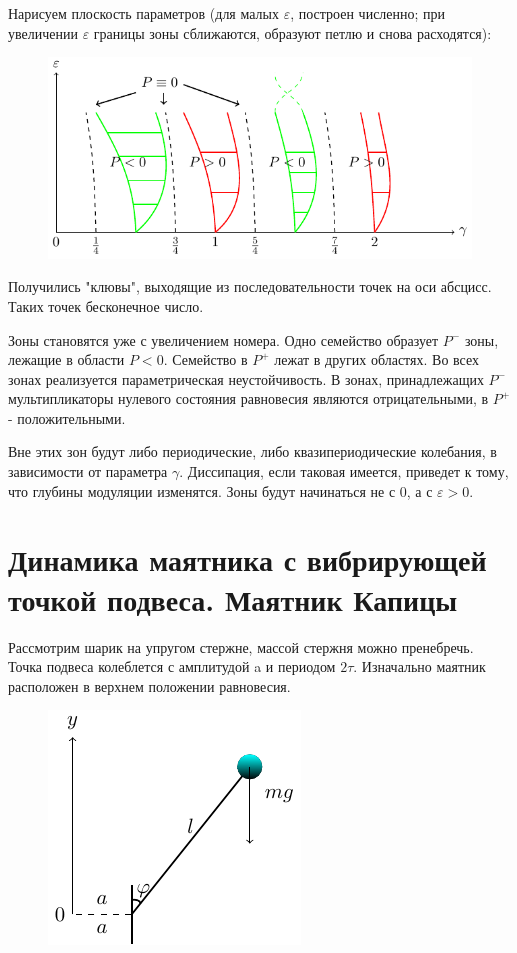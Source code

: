 Нарисуем плоскость параметров (для малых $\varepsilon$, построен численно; при увеличении $\varepsilon$ границы зоны сближаются, образуют петлю и снова расходятся):
\begin{figure}[H]
	\centering
	\includegraphics[width=0.5\linewidth]{fig/fig45.pdf}   
\end{figure}

Получились "клювы", выходящие из последовательности точек на оси абсцисс. Таких точек бесконечное число. 

Зоны становятся уже с увеличением номера. Одно семейство образует $P^-$ зоны, лежащие в области $P<0$. Семейство в $P^+$ лежат в других областях. Во всех зонах реализуется параметрическая неустойчивость. В зонах, принадлежащих $P^-$ мультипликаторы нулевого состояния равновесия являются отрицательными, в $P^+$ - положительными.  

Вне этих зон будут либо периодические, либо квазипериодические колебания, в зависимости от параметра $\gamma$. Диссипация, если таковая имеется, приведет к тому, что глубины модуляции изменятся. Зоны будут начинаться не с 0, а с $\varepsilon>0$. 

\section{Динамика маятника с вибрирующей точкой подвеса. Маятник Капицы}
Рассмотрим шарик на упругом стержне, массой стержня можно пренебречь. Точка подвеса колеблется с амплитудой a и периодом $2\tau$. Изначально маятник расположен в верхнем положении равновесия. 

\begin{figure} 
\vspace{0.25em}
\centering
\includegraphics[scale=1.5]{fig/fig46.pdf}
\vspace{-0.25em}
\end{figure}

